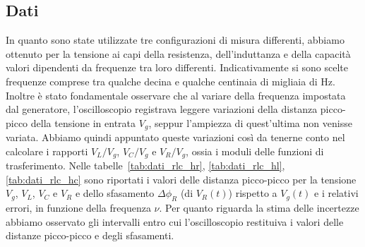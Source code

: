 \documentclass[a4paper]{article}
\begin{document}
\subsection{Dati}
In quanto sono state utilizzate tre configurazioni di misura differenti, abbiamo ottenuto per la tensione ai capi della resistenza, dell'induttanza e della capacità valori dipendenti da frequenze tra loro differenti. Indicativamente si sono scelte frequenze comprese tra qualche decina e qualche centinaia di migliaia di \si{\hertz}. Inoltre è stato fondamentale osservare che al variare della frequenza impostata dal generatore, l'oscilloscopio registrava leggere variazioni della distanza picco-picco della tensione in entrata $V_g$, seppur l'ampiezza di quest'ultima non venisse variata. Abbiamo quindi appuntato queste variazioni così da tenerne conto nel calcolare i rapporti $V_L/V_g$, $V_C/V_g$ e $V_R/V_g$, ossia i moduli delle funzioni di trasferimento. Nelle tabelle~\ref{tab:dati_rlc_hr}, \ref{tab:dati_rlc_hl}, \ref{tab:dati_rlc_hc} sono riportati i valori delle distanza picco-picco per la tensione $V_g$, $V_L$, $V_C$ e $V_R$ e dello sfasamento $\Delta\phi_R$ (di $V_R(t)$) rispetto a $V_g(t)$ e i relativi errori, in funzione della frequenza $\nu$. Per quanto riguarda la stima delle incertezze abbiamo osservato gli intervalli entro cui l'oscilloscopio restituiva i valori delle distanze picco-picco e degli sfasamenti.
\end{document}
